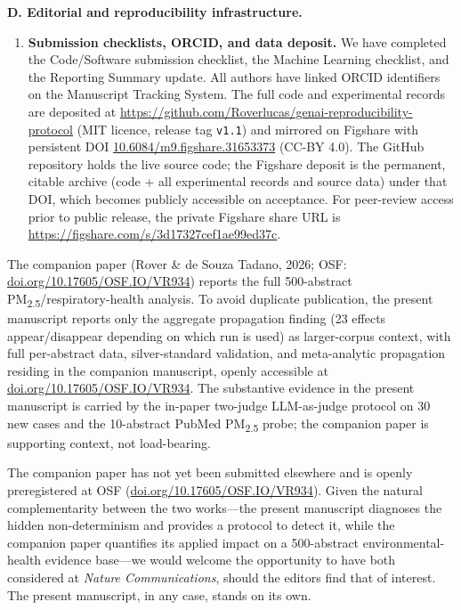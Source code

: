 \documentclass[11pt,a4paper]{article}
\begin{document}
\medskip
\noindent\textbf{D. Editorial and reproducibility infrastructure.}
\begin{enumerate}[leftmargin=*,resume]
  \item \textbf{Submission checklists, ORCID, and data deposit.} We have completed the Code/Software submission checklist, the Machine Learning checklist, and the Reporting Summary update. All authors have linked ORCID identifiers on the Manuscript Tracking System. The full code and experimental records are deposited at \url{https://github.com/Roverlucas/genai-reproducibility-protocol} (MIT licence, release tag \texttt{v1.1}) and mirrored on Figshare with persistent DOI \href{https://doi.org/10.6084/m9.figshare.31653373}{10.6084/m9.figshare.31653373} (CC-BY 4.0). The GitHub repository holds the live source code; the Figshare deposit is the permanent, citable archive (code + all experimental records and source data) under that DOI, which becomes publicly accessible on acceptance. For peer-review access prior to public release, the private Figshare share URL is \href{https://figshare.com/s/3d17327cef1ae99ed37c}{https://figshare.com/s/3d17327cef1ae99ed37c}.
\end{enumerate}

The companion paper (Rover \& de Souza Tadano, 2026; OSF: \href{https://doi.org/10.17605/OSF.IO/VR934}{doi.org/10.17605/OSF.IO/VR934}) reports the full 500-abstract PM\textsubscript{2.5}/respiratory-health analysis. To avoid duplicate publication, the present manuscript reports only the aggregate propagation finding (23 effects appear/disappear depending on which run is used) as larger-corpus context, with full per-abstract data, silver-standard validation, and meta-analytic propagation residing in the companion manuscript, openly accessible at \href{https://doi.org/10.17605/OSF.IO/VR934}{doi.org/10.17605/OSF.IO/VR934}. The substantive evidence in the present manuscript is carried by the in-paper two-judge LLM-as-judge protocol on 30 new cases and the 10-abstract PubMed PM\textsubscript{2.5} probe; the companion paper is supporting context, not load-bearing.

The companion paper has not yet been submitted elsewhere and is openly preregistered at OSF (\href{https://doi.org/10.17605/OSF.IO/VR934}{doi.org/10.17605/OSF.IO/VR934}). Given the natural complementarity between the two works---the present manuscript diagnoses the hidden non-determinism and provides a protocol to detect it, while the companion paper quantifies its applied impact on a 500-abstract environmental-health evidence base---we would welcome the opportunity to have both considered at \emph{Nature Communications}, should the editors find that of interest. The present manuscript, in any case, stands on its own.
\end{document}
